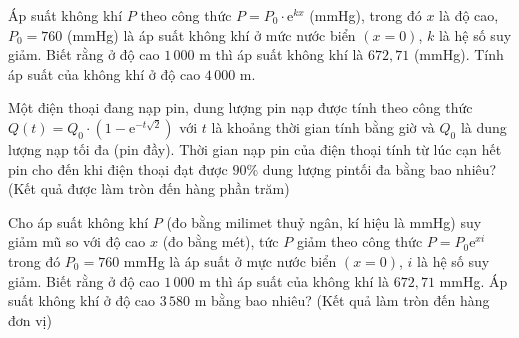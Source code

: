 \begin{ex}%
	Áp suất không khí $P$ theo công thức $P=P_0\cdot\mathrm{e}^{kx}$ (mmHg), trong đó $x$ là độ cao, $P_0=760$ (mmHg) là áp suất không khí ở mức nước biển $(x=0)$, $k$ là hệ số suy giảm. Biết rằng ở độ cao $1\,000$  m thì áp suất không khí là $672{,}71$ (mmHg). Tính áp suất của không khí ở độ cao $4\,000$ m.
\end{ex}

\begin{ex}%
	Một điện thoại đang nạp pin, dung lượng pin nạp được tính theo công thức\\ $Q(t)=Q_0\cdot\left(1-\mathrm{e}^{-t\sqrt{2}}\right)$ với $t$ là khoảng thời gian tính bằng giờ  và $Q_0$ là dung lượng nạp tối đa (pin đầy). Thời gian nạp pin của điện thoại tính từ lúc cạn hết pin cho đến khi điện thoại đạt được $90\%$ dung lượng pintối đa bằng bao nhiêu? (Kết quả được làm tròn đến hàng phần trăm)
\end{ex}

\begin{ex}%
	Cho áp suất không khí $P$ (đo bằng milimet thuỷ ngân, kí hiệu là mmHg) suy giảm mũ so với độ cao $x$ (đo bằng mét), tức $P$ giảm theo công thức $P=P_0\mathrm{e}^{xi}$ trong đó $P_0=760$ mmHg là áp suất ở mực nước biển $(x=0)$, $i$ là hệ số suy giảm. Biết rằng ở độ cao $1\,000$ m thì áp suất của không khí là $672{,}71$ mmHg. Áp suất không khí ở độ cao $3\,580$ m bằng bao nhiêu? (Kết quả làm tròn đến  hàng đơn vị)
\end{ex}

